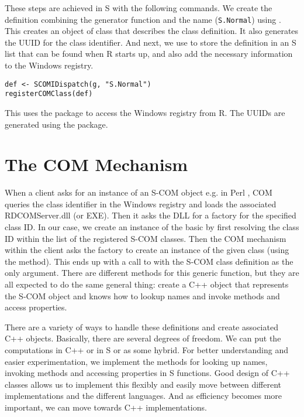 \documentclass[11pt]{article}
\begin{document}
These steps are achieved in S with the following commands.  We create
the definition combining the generator function and the name
(\texttt{S.Normal}) using .  This creates an
object of class  that describes the class
definition.  It also generates the UUID for the class identifier.  And
next, we use  to store the definition in
an S list that can be found when R starts up, and also add the
necessary information to the Windows registry.
\begin{verbatim}
def <- SCOMIDispatch(g, "S.Normal")
registerCOMClass(def)
\end{verbatim}

This uses the  package\cite{SWinRegistry} to
access the Windows registry from R.  The UUIDs are generated using the
 package\cite{Ruuid}.


\section{The COM Mechanism}
When a client asks for an instance of an S-COM object e.g. in Perl
, COM queries the class identifier in the
Windows registry and loads the associated RDCOMServer.dll (or EXE).
Then it asks the DLL for a factory for the specified class ID.  In our
case, we create an instance of the basic  by first
resolving the class ID within the list of the registered S-COM
classes.  Then the COM mechanism within the client asks the factory to
create an instance of the given class (using the
 method).  This ends up with a call to
 with the S-COM class definition as the
only argument.  There are different methods for this generic function,
but they are all expected to do the same general thing: create a C++
object that represents the S-COM object and knows how to lookup names
and invoke methods and access properties.

There are a variety of ways to handle these definitions and create
associated C++ objects. Basically, there are several degrees of
freedom.  We can put the computations in C++ or in S or as some
hybrid.  For better understanding and easier experimentation, we
implement the methods for looking up names, invoking methods and
accessing properties in S functions.  Good design of C++ classes
allows us to implement this flexibly and easily move between different
implementations and the different languages.  And as efficiency
becomes more important, we can move towards C++ implementations.
\end{document}
